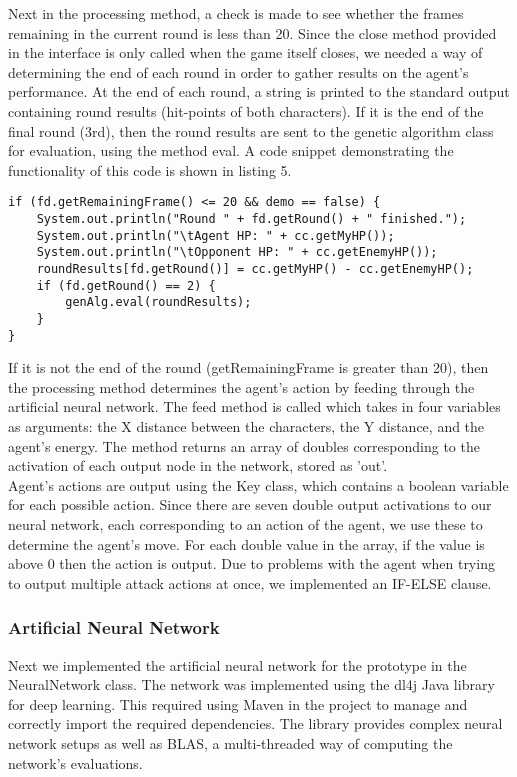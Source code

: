 \documentclass[12pt,a4paper]{article}
\begin{document}
Next in the processing method, a check is made to see whether the frames remaining in the current round is less than 20. Since the close method provided in the interface is only called when the game itself closes, we needed a way of determining the end of each round in order to gather results on the agent's performance. At the end of each round, a string is printed to the standard output containing round results (hit-points of both characters). If it is the end of the final round (3rd), then the round results are sent to the genetic algorithm class for evaluation, using the method eval. A code snippet demonstrating the functionality of this code is shown in listing 5.

\singlespacing
\begin{lstlisting}[caption=Prototype2: processing end of round]
if (fd.getRemainingFrame() <= 20 && demo == false) {
	System.out.println("Round " + fd.getRound() + " finished.");
	System.out.println("\tAgent HP: " + cc.getMyHP());
	System.out.println("\tOpponent HP: " + cc.getEnemyHP());
	roundResults[fd.getRound()] = cc.getMyHP() - cc.getEnemyHP();
	if (fd.getRound() == 2) {
		genAlg.eval(roundResults);
	}
}
\end{lstlisting}
\onehalfspace
If it is not the end of the round (getRemainingFrame is greater than 20), then the processing method determines the agent's action by feeding through the artificial neural network. The feed method is called which takes in four variables as arguments: the X distance between the characters, the Y distance, and the agent's energy. The method returns an array of doubles corresponding to the activation of each output node in the network, stored as 'out'.\\

Agent's actions are output using the Key class, which contains a boolean variable for each possible action. Since there are seven double output activations to our neural network, each corresponding to an action of the agent, we use these to determine the agent's move. For each double value in the array, if the value is above 0 then the action is output. Due to problems with the agent when trying to output multiple attack actions at once, we implemented an IF-ELSE clause.
\newpage
\subsubsection*{Artificial Neural Network}
Next we implemented the artificial neural network for the prototype in the NeuralNetwork class. The network was implemented using the dl4j Java library for deep learning. This required using Maven in the project to manage and correctly import the required dependencies. The library provides complex neural network setups as well as BLAS, a multi-threaded way of computing the network's evaluations.\\
\end{document}
